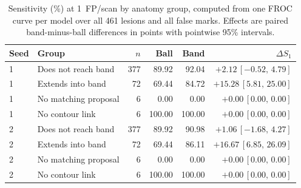 \begin{table}[!t]
\centering
\small
\caption{Sensitivity (\%) at 1~FP/scan by anatomy group, computed from one FROC curve per model over all 461 lesions and all false marks. Effects are paired band-minus-ball differences in points with pointwise 95\% intervals.}
\label{tab:anatomy_one}
\begin{tabular}{@{}llrrrr@{}}
\toprule
Seed & Group & $n$ & Ball & Band & $\Delta S_1$ \\
\midrule
1 & Does not reach band & 377 & 89.92 & 92.04 & $+2.12\,[-0.52,\,4.79]$ \\
1 & Extends into band & 72 & 69.44 & 84.72 & $+15.28\,[5.81,\,25.00]$ \\
1 & No matching proposal & 6 & 0.00 & 0.00 & $+0.00\,[0.00,\,0.00]$ \\
1 & No contour link & 6 & 100.00 & 100.00 & $+0.00\,[0.00,\,0.00]$ \\
2 & Does not reach band & 377 & 89.92 & 90.98 & $+1.06\,[-1.68,\,4.27]$ \\
2 & Extends into band & 72 & 69.44 & 86.11 & $+16.67\,[6.85,\,26.09]$ \\
2 & No matching proposal & 6 & 0.00 & 0.00 & $+0.00\,[0.00,\,0.00]$ \\
2 & No contour link & 6 & 100.00 & 100.00 & $+0.00\,[0.00,\,0.00]$ \\
\bottomrule
\end{tabular}
\end{table}
